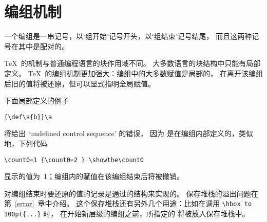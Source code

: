 \documentclass{book}
\begin{document}
\section{编组机制}

一个编组是一串记号，以`组开始'记号开头，以`组结束'记号结尾，
而且这两种记号在其中是配对的。

\TeX\ 的机制与普通编程语言的块作用域不同。
大多数语言的块结构中只能有局部定义。
\TeX\ 的编组机制更加强大：编组中的大多数赋值是局部的，
在离开该编组后旧的值将被还原，但可以显式指明全局赋值。

下面局部定义的例子
\begin{verbatim}
{\def\a{b}}\a
\end{verbatim}
将给出 `undefined control sequence' 的错误，
因为  是在编组内部定义的，类似地，下列代码
\begin{verbatim}
\count0=1 {\count0=2 } \showthe\count0
\end{verbatim}
显示的值为~1；编组内的赋值在该编组结束后将被撤销。

对编组结束时要还原的值的记录是通过的结构来实现的。
保存堆栈的溢出问题在第~\ref{error}~章中介绍。
这个保存堆栈还有另外几个用途：比如在调用 \hbox{\verb>\hbox to 100pt{...}>} 时，
在开始新层级的编组之前，所指定的 \hbox{} 将被放入保存堆栈中。
\end{document}

